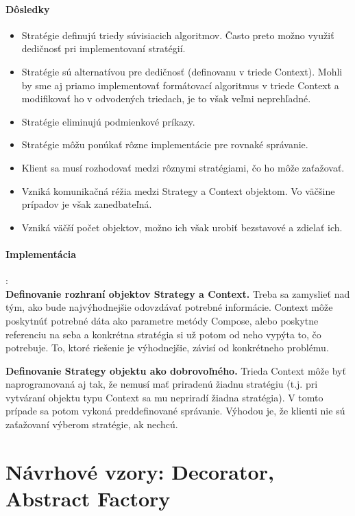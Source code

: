 		\paragraph{Dôsledky}
			\begin{itemize}
				\item Stratégie definujú triedy súvisiacich algoritmov. Často preto možno využiť dedičnosť pri implementovaní stratégií.
				\item Stratégie sú alternatívou pre dedičnosť (definovanu v triede Context). Mohli by sme aj priamo implementovať formátovací algoritmus v triede Context a modifikovať ho v odvodených triedach, je to však veľmi neprehľadné.
				\item Stratégie eliminujú podmienkové príkazy.
				\item Stratégie môžu ponúkať rôzne implementácie pre rovnaké správanie.
				\item Klient sa musí rozhodovať medzi rôznymi stratégiami, čo ho môže zaťažovať.
				\item Vzniká komunikačná réžia medzi Strategy a Context objektom. Vo väčšine prípadov je však zanedbateľná.
				\item Vzniká väčší počet objektov, možno ich však urobiť bezstavové a zdielať ich.
			\end{itemize}
		\paragraph{Implementácia}:\\
			\textbf{Definovanie rozhraní objektov Strategy a Context.}
				Treba sa zamyslieť nad tým, ako bude najvýhodnejšie odovzdávať potrebné informácie. Context môže poskytnúť potrebné dáta ako parametre metódy Compose, alebo poskytne referenciu na seba a konkrétna stratégia si už potom od neho vypýta to, čo potrebuje. To, ktoré riešenie je výhodnejšie, závisí od konkrétneho problému.

			\textbf{Definovanie Strategy objektu ako dobrovoľného.}
				Trieda Context môže byť naprogramovaná aj tak, že nemusí mať priradenú žiadnu stratégiu (t.j. pri vytváraní objektu typu Context sa mu nepriradí žiadna stratégia). V tomto prípade sa potom vykoná preddefinované správanie. Výhodou je, že klienti nie sú zaťažovaní výberom stratégie, ak nechcú.


\section{Návrhové vzory: Decorator, Abstract Factory}
